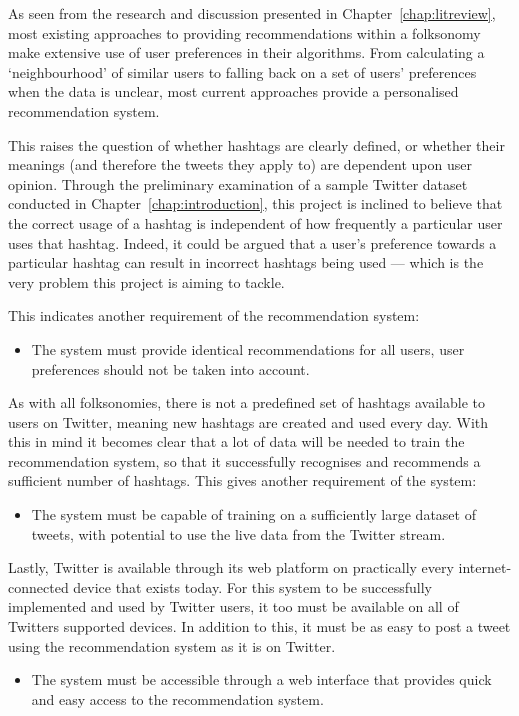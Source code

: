 \documentclass[11pt,a4paper]{report}
\begin{document}
As seen from the research and discussion presented in Chapter~\ref{chap:litreview}, most existing approaches to providing recommendations within a folksonomy make extensive use of user preferences in their algorithms. From calculating a `neighbourhood' of similar users to falling back on a set of users' preferences when the data is unclear, most current approaches provide a personalised recommendation system.

This raises the question of whether hashtags are clearly defined, or whether their meanings (and therefore the tweets they apply to) are dependent upon user opinion. Through the preliminary examination of a sample Twitter dataset conducted in Chapter~\ref{chap:introduction}, this project is inclined to believe that the correct usage of a hashtag is independent of how frequently a particular user uses that hashtag. Indeed, it could be argued that a user's preference towards a particular hashtag can result in incorrect hashtags being used --- which is the very problem this project is aiming to tackle.

This indicates another requirement of the recommendation system:
\begin{itemize}
    \item The system must provide identical recommendations for all users, user preferences should not be taken into account.
\end{itemize}

As with all folksonomies, there is not a predefined set of hashtags available to users on Twitter, meaning new hashtags are created and used every day. With this in mind it becomes clear that a lot of data will be needed to train the recommendation system, so that it successfully recognises and recommends a sufficient number of hashtags. This gives another requirement of the system:
\begin{itemize}
    \item The system must be capable of training on a sufficiently large dataset of tweets, with potential to use the live data from the Twitter stream.
\end{itemize}

Lastly, Twitter is available through its web platform on practically every internet-connected device that exists today. For this system to be successfully implemented and used by Twitter users, it too must be available on all of Twitters supported devices. In addition to this, it must be as easy to post a tweet using the recommendation system as it is on Twitter.
\begin{itemize}
    \item The system must be accessible through a web interface that provides quick and easy access to the recommendation system.
\end{itemize}
\end{document}
